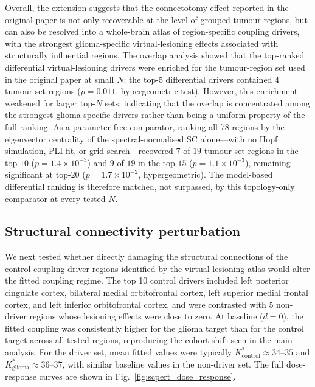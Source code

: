 \documentclass[11pt, reprint, aps, prl, floatfix, secnumarabic]{revtex4-2}
\begin{document}
Overall, the extension suggests that the connectotomy effect reported in the original paper is not only recoverable at the level of grouped tumour regions, but can also be resolved into a whole-brain atlas of region-specific coupling drivers, with the strongest glioma-specific virtual-lesioning effects associated with structurally influential regions.
The overlap analysis showed that the top-ranked differential virtual-lesioning drivers were enriched for the tumour-region set used in the original paper at small \(N\): the top-5 differential drivers contained 4 tumour-set regions (\(p = 0.011\), hypergeometric test). However, this enrichment weakened for larger top-\(N\) sets, indicating that the overlap is concentrated among the strongest glioma-specific drivers rather than being a uniform property of the full ranking. As a parameter-free comparator, ranking all 78 regions by the eigenvector centrality of the spectral-normalised SC alone---with no Hopf simulation, PLI fit, or grid search---recovered $7$ of $19$ tumour-set regions in the top-$10$ ($p = 1.4\times10^{-3}$) and $9$ of $19$ in the top-$15$ ($p = 1.1\times10^{-3}$), remaining significant at top-$20$ ($p = 1.7\times10^{-2}$, hypergeometric). The model-based differential ranking is therefore matched, not surpassed, by this topology-only comparator at every tested $N$.






\subsection{Structural connectivity perturbation}
We next tested whether directly damaging the structural connections of the control coupling-driver regions identified by the virtual-lesioning atlas would alter the fitted coupling regime. The top 10 control drivers included left posterior cingulate cortex, bilateral medial orbitofrontal cortex, left superior medial frontal cortex, and left inferior orbitofrontal cortex, and were contrasted with 5 non-driver regions whose lesioning effects were close to zero.
At baseline ($d=0$), the fitted coupling was consistently higher for the glioma target than for the control target across all tested regions, reproducing the cohort shift seen in the main analysis. For the driver set, mean fitted values were typically $K^{*}_{\mathrm{control}} \approx 34$--$35$ and $K^{*}_{\mathrm{glioma}} \approx 36$--$37$, with similar baseline values in the non-driver set. The full dose-response curves are shown in Fig.~\ref{fig:scpert_dose_response}.
\end{document}
